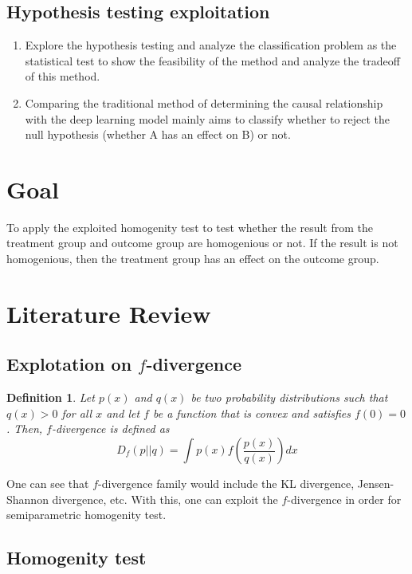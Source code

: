 \documentclass{article}
\newtheorem{definition}{Definition}
\begin{document}
\subsection{Hypothesis testing exploitation}
\begin{enumerate}
    \item Explore the hypothesis testing and analyze the classification problem as the 
    statistical test to show the feasibility of the method and analyze the tradeoff of this 
    method.
    \item Comparing the traditional method of determining the causal relationship with the 
    deep learning model mainly aims to classify whether to reject the null hypothesis 
    (whether A has an effect on B) or not.
\end{enumerate}
\section{Goal}

To apply the exploited homogenity test to test whether the result from the treatment group and outcome group
are homogenious or not. If the result is not homogenious, then the treatment group has an effect on the outcome group.
\section{Literature Review}

\subsection{Explotation on $f$-divergence}

\begin{definition}
Let $p(x)$ and $q(x)$ be two probability distributions such that $q(x) > 0$ for all $x$ and 
let $f$ be a function that is convex and satisfies $f(0)=0$. Then, $f$-divergence is defined as
\begin{equation}
    D_f(p||q) = \int p(x) f\left(\frac{p(x)}{q(x)}\right) dx
\end{equation}
\end{definition}
One can see that $f$-divergence family would include the KL divergence, Jensen-Shannon divergence, etc.
With this, one can exploit the $f$-divergence in order for semiparametric homogenity test.

\subsection{Homogenity test}
\end{document}
